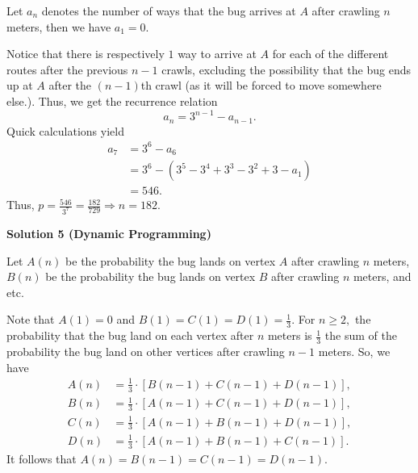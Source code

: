 \begin{enumerate}
Let $a_n$ denotes the number of ways that the bug arrives at $A$ after crawling $n$ meters, then we have $a_1=0$.

 Notice that there is respectively $1$ way to arrive at $A$ for each of the different routes after the previous $n-1$ crawls, excluding the possibility that the bug ends up at $A$ after the $(n-1)$th crawl (as it will be forced to move somewhere else.). Thus, we get the recurrence relation 
 \[a_n=3^{n-1}-a_{n-1}.\]Quick calculations yield
 \begin{align*} a_7&=3^6-a_6\\ &=3^6-\left(3^5-3^4+3^3-3^2+3-a_1\right)\\ &=546. \end{align*}
Thus, $p=\frac{546}{3^7}=\frac{182}{729}\Longrightarrow n=\boxed{182}$.

 



\textbf{Solution 5 (Dynamic Programming)}

Let $A(n)$ be the probability the bug lands on vertex $A$ after crawling $n$ meters, $B(n)$ be the probability the bug lands on vertex $B$ after crawling $n$ meters, and etc.

 Note that $A(1)=0$ and $B(1)=C(1)=D(1)=\frac13.$ For $n\geq2,$ the probability that the bug land on each vertex after $n$ meters is $\frac13$ the sum of the probability the bug land on other vertices after crawling $n-1$ meters. So, we have
 \begin{align*} A(n) &= \frac13 \cdot [B(n-1) + C(n-1) + D(n-1)], \\ B(n) &= \frac13 \cdot [A(n-1) + C(n-1) + D(n-1)], \\ C(n) &= \frac13 \cdot [A(n-1) + B(n-1) + D(n-1)], \\ D(n) &= \frac13 \cdot [A(n-1) + B(n-1) + C(n-1)]. \end{align*}
It follows that $A(n) = B(n-1) = C(n-1) = D(n-1).$


\end{enumerate}
